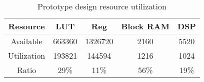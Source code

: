 \begin{table}[tb]
    \centering
    \caption{Prototype design resource utilization}
      \begin{tabular}{|c|c|c|c|c|}
      \hline
      Resource & LUT   & Reg   & Block RAM & DSP \\
      \hline
      Available & 663360 & 1326720 & 2160  & 5520 \\
      \hline
      Utilization & 193821 & 144594 & 1216   & 1024 \\
      \hline
      Ratio & 29\%  & 11\%  & 56\%  & 19\% \\
      \hline
      \end{tabular}
    \label{tab:util}
  \end{table}